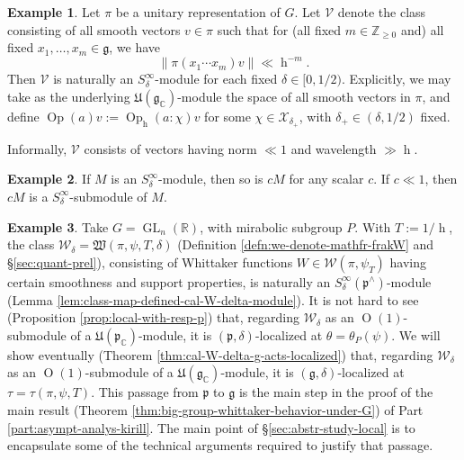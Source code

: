 \documentclass[reqno]{amsart}
\DeclareMathOperator{\GL}{GL}
\DeclareMathOperator{\h}{h}
\def\O{\operatorname{O}}
\DeclareMathOperator{\Opp}{Op}
\theoremstyle{plain} \newtheorem{theorem} {Theorem}
\theoremstyle{definition} \newtheorem{definition} [theorem] {Definition}
\newtheorem{example} [theorem] {Example}
\theoremstyle{itplain} %
\numberwithin{equation}{section}
\numberwithin{theorem}{section}
\renewcommand{\geq}{\geqslant}
\begin{document}
\begin{example}\label{example:class-V-wavelength-h}
  Let $\pi$ be a unitary representation of $G$.  Let $\mathcal{V}$  denote the class consisting of all smooth vectors $v \in \pi$ such that for (all fixed $m \in \mathbb{Z}_{\geq 0}$  and) all fixed $x_1,\dotsc,x_m \in \mathfrak{g}$, we have
  \[
    \|\pi(x_1 \dotsb x_m) v\| \ll \h^{-m}.
  \]
  Then $\mathcal{V}$ is naturally an $S^\infty_\delta$-module for each fixed $\delta \in [0,1/2)$.  Explicitly, we may take as the underlying $\mathfrak{U}(\mathfrak{g}_\mathbb{C})$-module the space of all smooth vectors in $\pi$, and define $\Opp(a) v := \Opp_{\h}(a:\chi) v$ for some $\chi \in \mathcal{X}_{\delta_+}$, with $\delta_+ \in (\delta, 1/2)$ fixed.

  Informally, $\mathcal{V}$ consists of vectors having norm $\ll 1$ and wavelength $\gg \h$.
\end{example}

\begin{example}
  If $M$ is an $S_\delta^\infty$-module, then so is $c M$ for any scalar $c$.  If $c \ll 1$, then $c M$ is a $S_\delta^\infty$-submodule of $M$.
\end{example}

\begin{example}\label{exa:cal-W-delta-mirabolic}
  Take $G = \GL_n(\mathbb{R})$, with mirabolic subgroup $P$.  With $T := 1/\h$, the class $\mathcal{W}_\delta = \mathfrak{W}(\pi,\psi,T,\delta)$ (Definition \ref{defn:we-denote-mathfr-frakW} and \S\ref{sec:quant-prel}), consisting of Whittaker functions $W \in \mathcal{W}(\pi,\psi_T)$ having certain smoothness and support properties, is naturally an $S_\delta^\infty(\mathfrak{p}^\wedge)$-module (Lemma \ref{lem:class-map-defined-cal-W-delta-module}).  It is not hard to see (Proposition \ref{prop:local-with-resp-p}) that, regarding $\mathcal{W}_\delta$ as an $\O(1)$-submodule of a $\mathfrak{U}(\mathfrak{p}_\mathbb{C})$-module, it is $(\mathfrak{p},\delta)$-localized at $\theta = \theta_P(\psi)$.  We will show eventually (Theorem \ref{thm:cal-W-delta-g-acts-localized}) that, regarding $\mathcal{W}_\delta$ as an $\O(1)$-submodule of a $\mathfrak{U}(\mathfrak{g}_\mathbb{C})$-module, it is $(\mathfrak{g},\delta)$-localized at $\tau = \tau(\pi,\psi,T)$.  This passage from $\mathfrak{p}$ to $\mathfrak{g}$ is the main step in the proof of the main result (Theorem \ref{thm:big-group-whittaker-behavior-under-G}) of Part \ref{part:asympt-analys-kirill}.  The main point of \S\ref{sec:abstr-study-local} is to encapsulate some of the technical arguments required to justify that passage.
\end{example}
\end{document}
